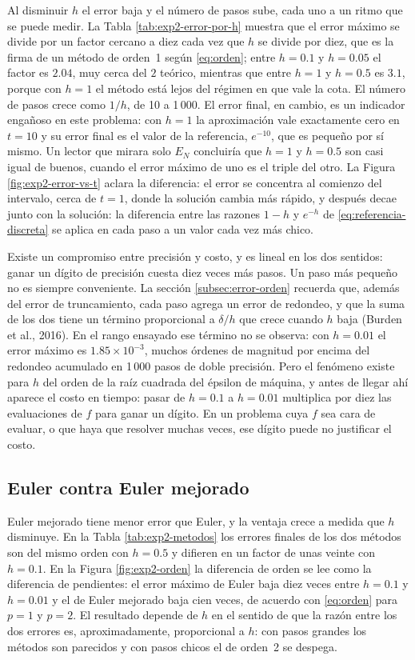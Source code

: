 Al disminuir $h$ el error baja y el número de pasos sube, cada uno a un ritmo que se puede
medir. La Tabla \ref{tab:exp2-error-por-h} muestra que el error máximo se divide por un
factor cercano a diez cada vez que $h$ se divide por diez, que es la firma de un método de
orden~1 según \eqref{eq:orden}; entre $h = 0.1$ y $h = 0.05$ el factor es $2.04$, muy cerca del
$2$ teórico, mientras que entre $h = 1$ y $h = 0.5$ es $3.1$, porque con $h = 1$ el método está
lejos del régimen en que vale la cota. El número de pasos crece como $1/h$, de 10 a 1\,000. El
error final, en cambio, es un indicador engañoso en este problema: con $h = 1$ la aproximación
vale exactamente cero en $t = 10$ y su error final es el valor de la referencia, $e^{-10}$, que
es pequeño por sí mismo. Un lector que mirara solo $E_N$ concluiría que $h = 1$ y $h = 0.5$ son
casi igual de buenos, cuando el error máximo de uno es el triple del otro. La Figura
\ref{fig:exp2-error-vs-t} aclara la diferencia: el error se concentra al comienzo del intervalo,
cerca de $t = 1$, donde la solución cambia más rápido, y después decae junto con la solución:
la diferencia entre las razones $1 - h$ y $e^{-h}$ de \eqref{eq:referencia-discreta} se aplica
en cada paso a un valor cada vez más chico.

Existe un compromiso entre precisión y costo, y es lineal en los dos sentidos: ganar un dígito
de precisión cuesta diez veces más pasos. Un paso más pequeño no es siempre conveniente. La
sección \ref{subsec:error-orden} recuerda que, además del error de truncamiento, cada paso
agrega un error de redondeo, y que la suma de los dos tiene un término proporcional a
$\delta/h$ que crece cuando $h$ baja (Burden et al., 2016). En el rango ensayado ese término no
se observa: con $h = 0.01$ el error máximo es $1.85 \times 10^{-3}$, muchos órdenes de magnitud
por encima del redondeo acumulado en 1\,000 pasos de doble precisión. Pero el fenómeno existe
para $h$ del orden de la raíz cuadrada del épsilon de máquina, y antes de llegar ahí aparece el
costo en tiempo: pasar de $h = 0.1$ a $h = 0.01$ multiplica por diez las evaluaciones de $f$
para ganar un dígito. En un problema cuya $f$ sea cara de evaluar, o que haya que resolver
muchas veces, ese dígito puede no justificar el costo.

\subsection{Euler contra Euler mejorado}
\label{subsec:dis-metodos}

Euler mejorado tiene menor error que Euler, y la ventaja crece a medida que $h$ disminuye. En la
Tabla \ref{tab:exp2-metodos} los errores finales de los dos métodos son del mismo orden con
$h = 0.5$ y difieren en un factor de unas veinte con $h = 0.1$. En la Figura
\ref{fig:exp2-orden} la diferencia de orden se lee como la diferencia de pendientes: el error
máximo de Euler baja diez veces entre $h = 0.1$ y $h = 0.01$ y el de Euler mejorado baja cien
veces, de acuerdo con \eqref{eq:orden} para $p = 1$ y $p = 2$. El resultado depende de $h$ en el
sentido de que la razón entre los dos errores es, aproximadamente, proporcional a $h$: con pasos
grandes los métodos son parecidos y con pasos chicos el de orden~2 se despega.

